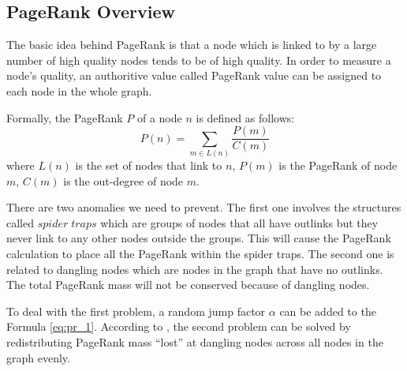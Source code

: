 \documentclass[12pt,conference,letterpaper]{IEEEtran}
\begin{document}
\subsection{PageRank Overview}
The basic idea behind PageRank is that a node which is linked to by a large number of high quality nodes tends to be of high quality. In order to measure a node's quality, an authoritive value called PageRank value can be assigned to each node in the whole graph. 



Formally, the PageRank $P$ of a node $n$ is defined as follows:
\begin{equation}
P(n) = \sum_{m \in L(n)} \frac{P(m)}{C(m)} \label{eq:pr_1}
\end{equation}
where $L(n)$ is the set of nodes that link to $n$, $P(m)$ is the PageRank of node $m$, $C(m)$ is the out-degree of node $m$.


There are two anomalies we need to prevent. The first one involves the structures called $spider\;traps$ which are groups of nodes that all have outlinks but they never link to any other nodes outside the groups. This will cause the PageRank calculation to place all the PageRank within the spider traps. The second one is related to dangling nodes which are nodes in the graph that have no outlinks. The total PageRank mass will not be conserved because of dangling nodes.

To deal with the first problem, a random jump factor $\alpha$ can be added to the Formula \ref{eq:pr_1}. According to \cite{monica2005}, the second problem can be solved by redistributing PageRank mass ``lost'' at dangling nodes across all nodes in the graph evenly.
\end{document}

